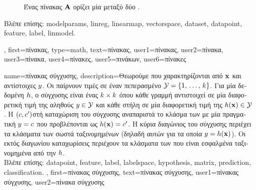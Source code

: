 {{\begin{figure}[H]
		{
		\caption{\foreignlanguage{greek}{Ένας πίνακας ${\bf A}$ ορίζει μία}  \foreignlanguage{greek}{μεταξύ 
		δύο} . \label{fig_matrix_dict}} }
		\end{figure}
		\foreignlanguage{greek}{Βλέπε επίσης:} \glspl{modelparam}, \gls{linreg}, \gls{linearmap}, \gls{vectorspace}, \gls{dataset}, 
		\gls{datapoint}, \gls{feature}, \gls{label}, \gls{linmodel}. },
	first={\foreignlanguage{greek}{πίνακας}},
	type=math,
	text={\foreignlanguage{greek}{πίνακας}},
	user1={\foreignlanguage{greek}{πίνακας}}, %
	user2={\foreignlanguage{greek}{πίνακα}}, %
	user3={\foreignlanguage{greek}{πίνακα}}, %
	user4={\foreignlanguage{greek}{πίνακες}}, %
	user5={\foreignlanguage{greek}{πινάκων}}, %
	user6={\foreignlanguage{greek}{πίνακες}} %
}

{name={\foreignlanguage{greek}{πίνακας σύγχυσης}}, 
	description={\foreignlanguage{greek}{Θεωρούμε}   
		\foreignlanguage{greek}{που χαρακτηρίζονται από}  ${\bf x}$ \foreignlanguage{greek}{και 
		αντίστοιχες}  $y$. \foreignlanguage{greek}{Οι}   
		\foreignlanguage{greek}{παίρνουν τιμές σε έναν πεπερασμένο}  $\mathcal{Y} = \{1, \,\ldots, \,k\}$. 
		\foreignlanguage{greek}{Για μία δεδομένη}  $h$, \foreignlanguage{greek}{ο} 
		 \foreignlanguage{greek}{σύγχυσης είναι ένας $k \times k$} 
		 \foreignlanguage{greek}{όπου κάθε γραμμή αντιστοιχεί σε μία διαφορετική τιμή της αληθούς} 
		 $y \in \mathcal{Y}$ \foreignlanguage{greek}{και κάθε στήλη σε μία διαφορετική τιμή της}  
		 $h({\bf x}) \in \mathcal{Y}$. \foreignlanguage{greek}{Η $(c,c')$στή 
		καταχώριση του}  \foreignlanguage{greek}{σύγχυσης αναπαριστά το κλάσμα των}  
		\foreignlanguage{greek}{με μία πραγματική}  $y = c$ \foreignlanguage{greek}{που προβλέπονται ως  
		$h({\bf x}) = c'$. Η κύρια διαγώνιος του}  \foreignlanguage{greek}{σύγχυσης 
		περιέχει τα κλάσματα των σωστά ταξινομημένων}  (\foreignlanguage{greek}{δηλαδή αυτών για 
		τα οποία $y = h({\bf x})$). Οι εκτός διαγωνίου καταχωρίσεις περιέχουν τα κλάσματα των} 
		 \foreignlanguage{greek}{που είναι εσφαλμένα ταξινομημένα από την} $h$. \\
		\foreignlanguage{greek}{Βλέπε επίσης:} \gls{datapoint}, \gls{feature}, \gls{label}, \gls{labelspace}, \gls{hypothesis}, \gls{matrix}, 
		\gls{prediction}, \gls{classification}. },
	first={\foreignlanguage{greek}{πίνακας σύγχυσης}},
	text={\foreignlanguage{greek}{πίνακας σύγχυσης}},
	user1={\foreignlanguage{greek}{πίνακας σύγχυσης}}, %
	user2={\foreignlanguage{greek}{πίνακα σύγχυσης}} %
}


